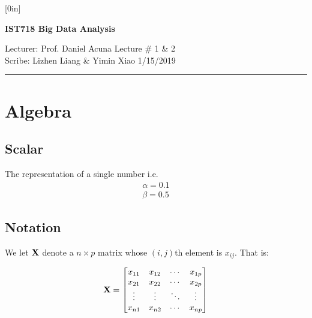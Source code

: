 \documentclass[11pt]{article}
\begin{document}
\thispagestyle{empty}

\raisebox{0.6in}[0in]{}
\vspace{-0.7in}

\begin{center}
\bf\large IST718 Big Data Analysis
\end{center}

\noindent
Lecturer:                Prof. Daniel Acuna
\hfill
Lecture \#               1 \& 2
\\
Scribe:                  Lizhen Liang \& Yimin Xiao
\hfill
                         1/15/2019

\noindent
\rule{\textwidth}{1pt}

\medskip

\section{Algebra}

\subsection{Scalar}
The representation of a single number  \newline\newline
i.e.\\
\begin{align*}
\alpha = 0.1\\
\beta = 0.5
\end{align*}

\subsection{Notation}
We let $\textbf X$ denote a $n \times p$ matrix whose $(i,j)$th element is $x_{ij}$. That is:  \newline

$$
\textbf X = \begin{bmatrix} x_{11}&x_{12}&\cdots&x_{1p}\\ x_{21}&x_{22}&\cdots&x_{2p}\\ 
\vdots&\vdots&\ddots&\vdots\\ x_{n1}&x_{n2}&\cdots&x_{np}\\ \end{bmatrix}
$$\newline
\end{document}
